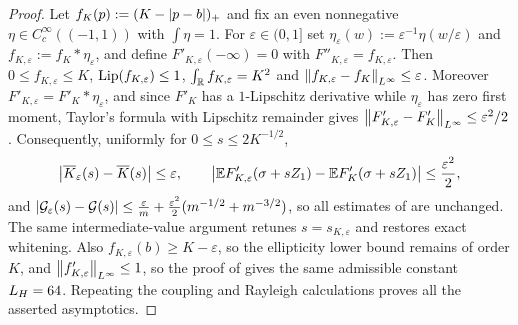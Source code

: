 \begin{proof}
Let $f_K(p):=(K-\left\lvert p-b\right\rvert)_+$ and fix an even nonnegative $\eta\in C_c^\infty((-1,1))$ with
$\int\eta=1$. For $\varepsilon\in(0,1]$ set $\eta_\varepsilon(w):=\varepsilon^{-1}\eta(w/\varepsilon)$
and $f_{K,\varepsilon}:=f_K*\eta_\varepsilon$, and define $F'_{K,\varepsilon}(-\infty)=0$ with
$F''_{K,\varepsilon}=f_{K,\varepsilon}$. Then $0\leq f_{K,\varepsilon}\leq K$,
$\operatorname{Lip}(f_{K,\varepsilon})\leq1$, $\int_{\mathbb{R}} f_{K,\varepsilon}=K^2$ and
$\left\lVert f_{K,\varepsilon}-f_K\right\rVert_{L^\infty}\leq\varepsilon$. Moreover
$F'_{K,\varepsilon}=F'_K*\eta_\varepsilon$, and since $F'_K$ has a $1$-Lipschitz derivative
while $\eta_\varepsilon$ has zero first moment, Taylor's formula with Lipschitz remainder gives
$\left\lVert F'_{K,\varepsilon}-F'_K\right\rVert_{L^\infty}\leq\varepsilon^2/2$. Consequently, uniformly for
$0\leq s\leq2K^{-1/2}$,
\[
    \left\lvert \overline K_\varepsilon(s)-\overline K(s)\right\rvert\leq\varepsilon,
    \qquad
    \left\lvert \mathbb{E} F'_{K,\varepsilon}(\sigma+sZ_1)-\mathbb{E} F'_K(\sigma+sZ_1)\right\rvert\leq\frac{\varepsilon^2}2,
\]
and
$\left\lvert \mathcal G_\varepsilon(s)-\mathcal G(s)\right\rvert\leq\tfrac\varepsilon m+\tfrac{\varepsilon^2}2(m^{-1/2}+m^{-3/2})$,
so all estimates of  are unchanged. The same intermediate-value
argument retunes $s=s_{K,\varepsilon}$ and restores exact whitening. Also
$f_{K,\varepsilon}(b)\geq K-\varepsilon$, so the ellipticity lower bound remains of order $K$,
and $\left\lVert f'_{K,\varepsilon}\right\rVert_{L^\infty}\leq1$, so the proof of  gives
the same admissible constant $L_H=64$. Repeating the coupling and Rayleigh calculations proves
all the asserted asymptotics.
\end{proof}

